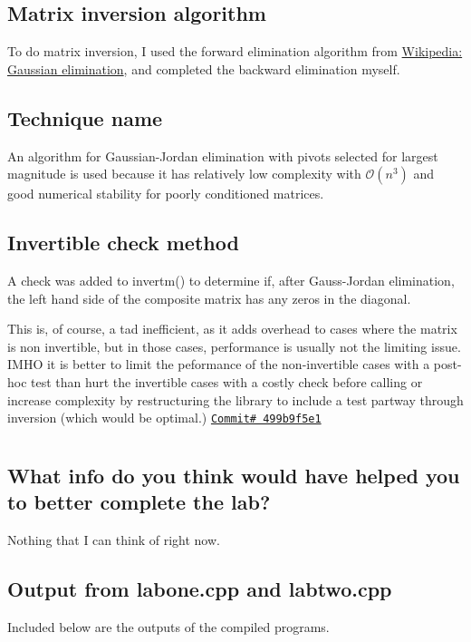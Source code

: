 \documentclass{article}
\begin{document}
\subsection{Matrix inversion algorithm}
To do matrix inversion, I used the forward elimination algorithm from  \href{https://en.wikipedia.org/wiki/Gaussian_elimination#Pseudocode}{Wikipedia: Gaussian elimination}, and completed the backward elimination myself.
\subsection{Technique name}
An algorithm for Gaussian-Jordan elimination with pivots selected for largest magnitude is used because it has relatively low complexity with $\mathcal{O}(n^3)$ and good numerical stability for poorly conditioned matrices.
\subsection{Invertible check method}
A check was added to invertm() to determine if, after Gauss-Jordan elimination, the left hand side of the composite matrix has any zeros in the diagonal.

This is, of course, a tad inefficient, as it adds overhead to cases where the matrix is non invertible, but in those cases, performance is usually not the limiting issue. IMHO it is better to limit the peformance of the non-invertible cases with a post-hoc test than hurt the invertible cases with a costly check before calling or increase complexity by restructuring the library to include a test partway through inversion (which would be optimal.) \href{https://github.com/tymo77/smart-products/commit/499b9f5e1da824d2720f8168dcaf1bd210213484}{\texttt{Commit\# 499b9f5e1}}

\section{}
\subsection{What info do you think would have helped you to better complete the lab?}
Nothing that I can think of right now.

\subsection{Output from labone.cpp and labtwo.cpp}
Included below are the outputs of the compiled programs.



\end{document}
